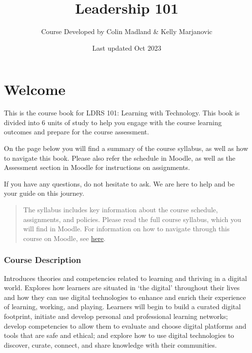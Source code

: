 \documentclass[
]{book}
\title{Leadership 101}
\author{Course Developed by Colin Madland \& Kelly Marjanovic}
\date{Last updated Oct 2023}
\theoremstyle{definition}
\theoremstyle{definition}
\theoremstyle{definition}
\theoremstyle{definition}
\theoremstyle{remark}
\begin{document}
\maketitle

{
\setcounter{tocdepth}{1}
\tableofcontents
}
\hypertarget{welcome}{%
\chapter*{Welcome}\label{welcome}}

This is the course book for LDRS 101: Learning with Technology. This book is divided into 6 units of study to help you engage with the course learning outcomes and prepare for the course assessment.

On the page below you will find a summary of the course syllabus, as well as how to navigate this book. Please also refer the schedule in Moodle, as well as the Assessment section in Moodle for instructions on assignments.

If you have any questions, do not hesitate to ask. We are here to help and be your guide on this journey.

\begin{quote}
The syllabus includes key information about the course schedule, assignments, and policies. Please read the full course syllabus, which you will find in Moodle. For information on how to navigate through this course on Moodle, see \href{https://trinitywestern.teamdynamix.com/TDClient/1904/Portal/KB/?CategoryID=8214}{here}.
\end{quote}

\hypertarget{course-description}{%
\subsection*{Course Description}\label{course-description}}

Introduces theories and competencies related to learning and thriving in a digital world. Explores how learners are situated in `the digital' throughout their lives and how they can use digital technologies to enhance and enrich their experience of learning, working, and playing. Learners will begin to build a curated digital footprint, initiate and develop personal and professional learning networks; develop competencies to allow them to evaluate and choose digital platforms and tools that are safe and ethical; and explore how to use digital technologies to discover, curate, connect, and share knowledge with their communities.
\end{document}
